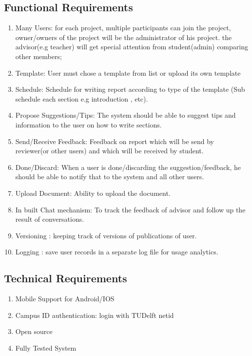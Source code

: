 \subsection{Functional Requirements} %
\label{sub:functional_requirement}
\begin{enumerate}
	\item Many Users: for each project, multiple participants can join the project, owner/owners of the project will be the administrator of his project. the advisor(e.g teacher) will get special attention from student(admin) comparing other members;
	\item Template: User must chose a template from list or upload its own template
	\item Schedule: Schedule for writing report according to type of the template  (Sub schedule each section e.g introduction , etc).
	\item Propose Suggestions/Tips: The system should be able to suggest tips and information to the user on how to write sections.
	\item Send/Receive Feedback: Feedback on report which will be send by reviewer(or other users) and which will be received by student.
	\item Done/Discard: When a user is done/discarding the suggestion/feedback, he should be able to notify that to the system and all other users. 
	\item Upload Document: Ability to upload the document.
	\item In built Chat mechanism: To track the feedback of advisor and follow up the result of conversations. 
	\item Versioning : keeping track of versions of publications of user.
	\item Logging : save user records in a separate log file for usage analytics.
\end{enumerate}

\subsection{Technical Requirements} %
\label{sub:technical_requirements}
\begin{enumerate}
	\item Mobile Support for Android/IOS
	\item Campus ID authentication: login with TUDelft netid
	\item Open source
 	\item Fully Tested System 
	 
\end{enumerate}


